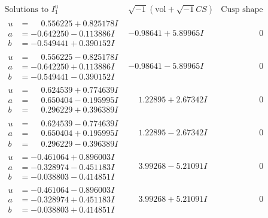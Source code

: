 \documentclass[1p]{elsarticle_modified}
\theoremstyle{definition}
\newcommand{\I}{\sqrt{-1}}
\begin{document}
$$\begin{array}{c|c|c}  
\text{Solutions to }I^u_{1}& \I (\text{vol} + \sqrt{-1}CS) & \text{Cusp shape}\\
 \hline 
\begin{aligned}
u &= \phantom{-}0.556225 + 0.825178 I \\
a &= -0.642250 - 0.113886 I \\
b &= -0.549441 + 0.390152 I\end{aligned}
 & -0.98641 + 5.89965 I & \phantom{-0.000000 } 0 \\ \hline\begin{aligned}
u &= \phantom{-}0.556225 - 0.825178 I \\
a &= -0.642250 + 0.113886 I \\
b &= -0.549441 - 0.390152 I\end{aligned}
 & -0.98641 - 5.89965 I & \phantom{-0.000000 } 0 \\ \hline\begin{aligned}
u &= \phantom{-}0.624539 + 0.774639 I \\
a &= \phantom{-}0.650404 - 0.195995 I \\
b &= \phantom{-}0.296229 + 0.396389 I\end{aligned}
 & \phantom{-}1.22895 + 2.67342 I & \phantom{-0.000000 } 0 \\ \hline\begin{aligned}
u &= \phantom{-}0.624539 - 0.774639 I \\
a &= \phantom{-}0.650404 + 0.195995 I \\
b &= \phantom{-}0.296229 - 0.396389 I\end{aligned}
 & \phantom{-}1.22895 - 2.67342 I & \phantom{-0.000000 } 0 \\ \hline\begin{aligned}
u &= -0.461064 + 0.896003 I \\
a &= -0.328974 - 0.451183 I \\
b &= -0.038803 - 0.414851 I\end{aligned}
 & \phantom{-}3.99268 - 5.21091 I & \phantom{-0.000000 } 0 \\ \hline\begin{aligned}
u &= -0.461064 - 0.896003 I \\
a &= -0.328974 + 0.451183 I \\
b &= -0.038803 + 0.414851 I\end{aligned}
 & \phantom{-}3.99268 + 5.21091 I & \phantom{-0.000000 } 0 \\ \hline\begin{aligned}

\end{aligned}
\end{array}$$
\end{document}

